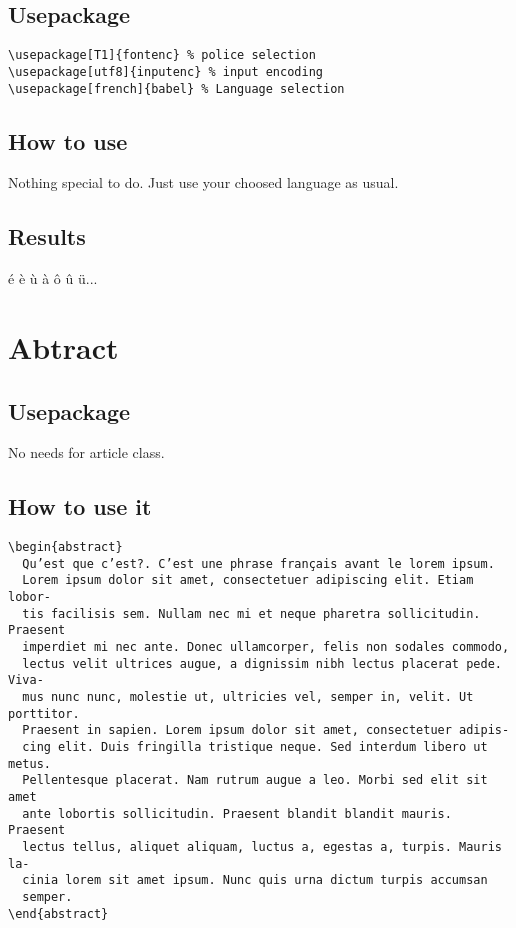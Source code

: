 \documentclass[a4paper,12pt]{article}
\begin{document}
\subsection{Usepackage}
\begin{verbatim}
\usepackage[T1]{fontenc} % police selection
\usepackage[utf8]{inputenc} % input encoding
\usepackage[french]{babel} % Language selection
\end{verbatim}
\subsection{How to use}
Nothing special to do. Just use your choosed language as usual.
\subsection{Results}
é è ù à ô û ü...


\newpage
\section{Abtract}
\subsection{Usepackage}
No needs for article class.
\subsection{How to use it}
\begin{verbatim}
\begin{abstract}
  Qu’est que c’est?. C’est une phrase français avant le lorem ipsum.
  Lorem ipsum dolor sit amet, consectetuer adipiscing elit. Etiam lobor-
  tis facilisis sem. Nullam nec mi et neque pharetra sollicitudin. Praesent
  imperdiet mi nec ante. Donec ullamcorper, felis non sodales commodo,
  lectus velit ultrices augue, a dignissim nibh lectus placerat pede. Viva-
  mus nunc nunc, molestie ut, ultricies vel, semper in, velit. Ut porttitor.
  Praesent in sapien. Lorem ipsum dolor sit amet, consectetuer adipis-
  cing elit. Duis fringilla tristique neque. Sed interdum libero ut metus.
  Pellentesque placerat. Nam rutrum augue a leo. Morbi sed elit sit amet
  ante lobortis sollicitudin. Praesent blandit blandit mauris. Praesent
  lectus tellus, aliquet aliquam, luctus a, egestas a, turpis. Mauris la-
  cinia lorem sit amet ipsum. Nunc quis urna dictum turpis accumsan
  semper.
\end{abstract}
\end{verbatim}
\end{document}
